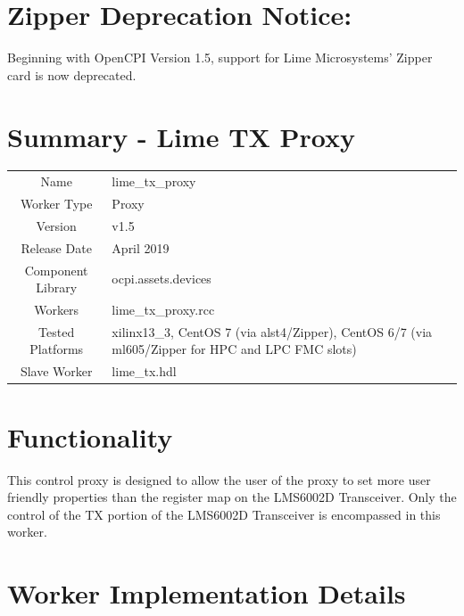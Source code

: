 \documentclass{article}
\author{} %
\date{Version \docVersion} %
\title{\docTitle}
\def\docVersion{1.5}
\def\comp{lime\_tx\_proxy}
\def\Comp{Lime TX Proxy}
\begin{document}
\section*{Zipper Deprecation Notice:}
Beginning with OpenCPI Version 1.5, support for Lime Microsystems' Zipper card is now deprecated.
\section*{Summary - \Comp}
\begin{tabular}{|c|M{13.5cm}|}
	\hline
	                  &                \\
	\hline
	Name              & \comp          \\
	\hline
	Worker Type       & Proxy          \\
	\hline
	Version           & v\docVersion \\
	\hline
	Release Date      & April 2019 \\
	\hline
	Component Library & ocpi.assets.devices   \\
	\hline
	Workers           & \comp.rcc      \\
	\hline
	Tested Platforms  & xilinx13\_3, CentOS 7 (via alst4/Zipper), CentOS 6/7 (via ml605/Zipper for HPC and LPC FMC slots) \\
	\hline
	Slave Worker      & lime\_tx.hdl   \\
	\hline
\end{tabular}

\section*{Functionality}
This control proxy is designed to allow the user of the proxy to set more user friendly properties than the register map on the LMS6002D Transceiver.  Only the control of the TX portion of the LMS6002D Transceiver is encompassed in this worker.

\section*{Worker Implementation Details}
\end{document}

